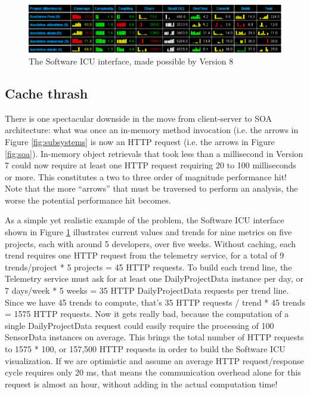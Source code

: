 \documentclass[conference,compsoc,peerreview]{IEEEtran}
\begin{document}
\begin{figure}[ht]
  \center
  \includegraphics[width=1.0\textwidth]{icu.eps}
  \caption{The Software ICU interface, made possible by Version 8}
  \label{fig:icu}
\end{figure} 

\subsection{Cache thrash}

There is one spectacular downside in the move from client-server to SOA
architecture: what was once an in-memory method invocation (i.e. the arrows
in Figure \ref{fig:subsystems} is now an HTTP request (i.e. the arrows in
Figure \ref{fig:soa}).  In-memory object retrievals that took less than a
millisecond in Version 7 could now require at least one HTTP request
requiring 20 to 100 milliseconds or more.  This constitutes a two to three
order of magnitude performance hit!  Note that the more ``arrows'' that must be traversed 
to perform an analysis, the worse the potential performance hit becomes. 

As a simple yet realistic example of the problem, the Software ICU
interface shown in Figure \ref{fig:icu} illustrates current values and
trends for nine metrics on five projects, each with around 5 developers,
over five weeks. Without caching, each trend requires one HTTP request from
the telemetry service, for a total of 9 trends/project * 5 projects = 45
HTTP requests.  To build each trend line, the Telemetry service must ask
for at least one DailyProjectData instance per day, or 7 days/week * 5
weeks = 35 HTTP DailyProjectData requests per trend line.  Since we have 45
trends to compute, that's 35 HTTP requests / trend * 45 trends = 1575 HTTP
requests.  Now it gets really bad, because the computation of a single
DailyProjectData request could easily require the processing of 100
SensorData instances on average.  This brings the total number of HTTP
requests to 1575 * 100, or 157,500 HTTP requests in order to build the
Software ICU visualization.  If we are optimistic and assume an average
HTTP request/response cycle requires only 20 ms, that means the
communication overhead alone for this request is almost an hour, without
adding in the actual computation time!
\end{document}
